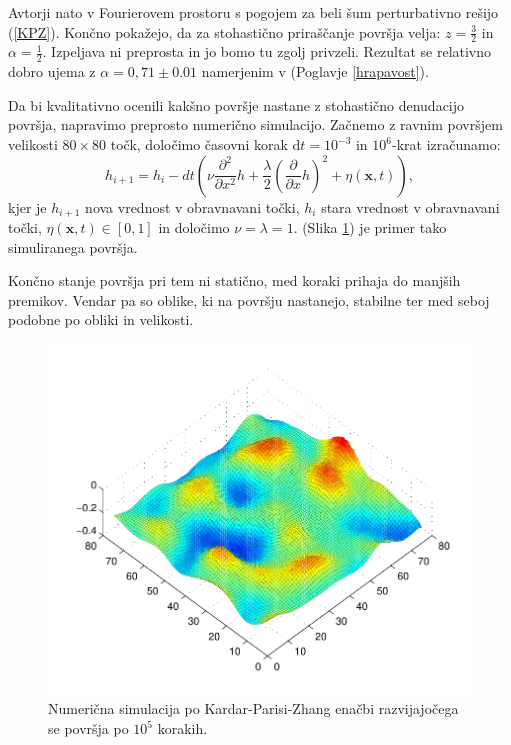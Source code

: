 \documentclass[a4paper, twoside, 12pt]{book}
\begin{document}
    Avtorji \cite{kardar1986dynamic} nato v Fourierovem prostoru s pogojem za beli šum perturbativno rešijo (\ref{KPZ}). Končno pokažejo, da za stohastično priraščanje površja velja: $z = \frac{3}{2}$ in $\alpha=\frac{1}{2}$. Izpeljava ni preprosta in jo bomo tu zgolj privzeli. Rezultat se relativno dobro ujema z $\alpha =  0,71 \pm 0.01$ namerjenim v (Poglavje \ref{hrapavost}).

Da bi kvalitativno ocenili kakšno površje nastane z stohastično denudacijo površja, napravimo preprosto numerično simulacijo. Začnemo z ravnim površjem velikosti $80\times80$ točk, določimo časovni korak $\mathrm{d}t=10^{-3}$ in $10^6$-krat izračunamo:
\begin{equation} 
  h_{i+1} = h_i - dt (\nu \frac{\partial^2}{\partial x^2} h + \frac{\lambda}{2} (\frac{\partial}{\partial x} h)^2 + \eta (\mathbf{x},t)),
\end{equation}
kjer je $h_{i+1}$ nova vrednost v obravnavani točki, $h_{i}$ stara vrednost v obravnavani točki, $\eta (\mathbf{x},t) \in [0,1]$ in določimo $\nu = \lambda = 1$. (Slika \ref{fig:KPZ-numericno}) je primer tako simuliranega površja.

Končno stanje površja pri tem ni statično, med koraki prihaja do manjših premikov. Vendar pa so oblike, ki na površju nastanejo, stabilne ter med seboj podobne po obliki in velikosti.

    \begin{figure}[h]
      \begin{center}
        \includegraphics[width=12cm]{slike/KPZ-numericno}
      \end{center}
      \caption{Numerična simulacija po Kardar-Parisi-Zhang enačbi razvijajočega se površja po $10^5$ korakih.}
      \label{fig:KPZ-numericno}
    \end{figure}
\end{document}
